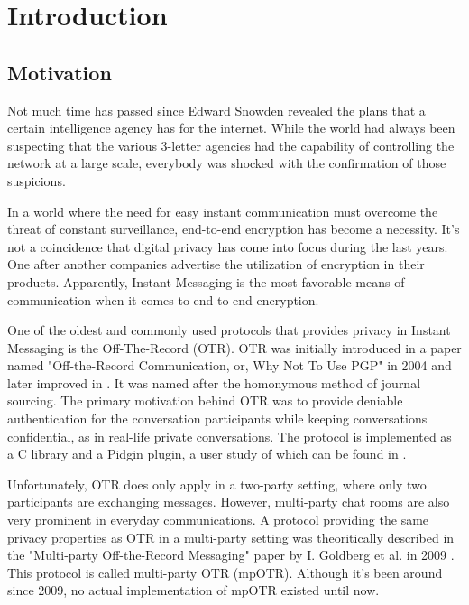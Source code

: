 \chapter{Introduction}

\label{chapter:introduction}

\newcommand{\dhname}{Diffie--Hellman }
\newcommand{\tdhname}{Triple Diffie--Hellman }



\section{Motivation}
Not much time has passed since Edward Snowden revealed the plans that a certain intelligence agency has for the internet. While the world had always been suspecting that the various 3-letter agencies had the capability of controlling the network at a large scale, everybody was shocked with the confirmation of those suspicions.

In a world where the need for easy instant communication must overcome the threat of constant surveillance, end-to-end encryption has become a necessity. It's not a coincidence that digital privacy has come into focus during the last years. One after another companies advertise the utilization of encryption in their products. Apparently, Instant Messaging is the most favorable means of communication when it comes to end-to-end encryption.

One of the oldest and commonly used protocols that provides privacy in Instant Messaging is the Off-The-Record (OTR). OTR was initially introduced in a paper named "Off-the-Record Communication, or, Why Not To Use PGP" in 2004 \cite{otr} and later improved in \cite{otr_improvedauth}. It was named after the homonymous method of journal sourcing. The primary motivation behind OTR was to provide deniable authentication for the conversation participants while keeping conversations confidential, as in real-life private conversations. The protocol is implemented as a C library and a Pidgin plugin, a user study of which can be found in \cite{otr_userstudy}.

Unfortunately, OTR does only apply in a two-party setting, where only two participants are exchanging messages. However, multi-party chat rooms are also very prominent in everyday communications. A protocol providing the same privacy properties as OTR in a multi-party setting was theoritically described in the "Multi-party Off-the-Record Messaging" paper by I. Goldberg et al. in 2009 \cite{mpotr}. This protocol is called multi-party OTR (mpOTR). Although it's been around since 2009, no actual implementation of mpOTR existed until now.

